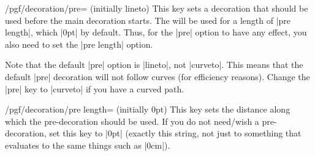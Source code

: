 \begin{key}{/pgf/decoration/pre= (initially lineto)}
    This key sets a decoration that should be used before the main decoration
    starts. The  will be used for a length of |pre length|,
    which |0pt| by default. Thus, for the |pre| option to have any effect, you
    also need to set the |pre length| option.
\begin{codeexample}[]
\end{codeexample}
\begin{codeexample}[]
\end{codeexample}
\begin{codeexample}[]
\end{codeexample}

    Note that the default |pre| option is |lineto|, not |curveto|. This means
    that the default |pre| decoration will not follow curves (for efficiency
    reasons). Change the |pre| key to |curveto| if you have a curved path.
\begin{codeexample}[]
\end{codeexample}
\begin{codeexample}[]
\end{codeexample}
\end{key}

\begin{key}{/pgf/decoration/pre length= (initially 0pt)}
    This key sets the distance along which the pre-decoration should be used.
    If you do not need/wish a pre-decoration, set this key to |0pt| (exactly
    this string, not just to something that evaluates to the same things such
    as |0cm|).
\end{key}

